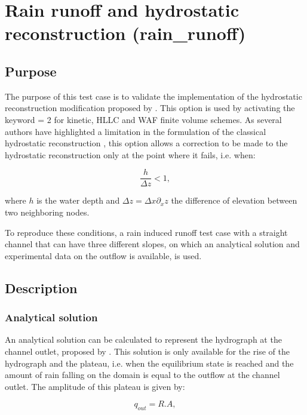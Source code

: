 \chapter{Rain runoff and hydrostatic reconstruction (rain\_runoff)}
\label{chapter:rain_runoff}

\section{Purpose}

The purpose of this test case is to validate the implementation of the
hydrostatic reconstruction modification proposed by \cite{Chen2017}.
This option is used by activating the keyword
 = 2 for kinetic, HLLC and WAF
finite volume schemes.
As several authors have highlighted a limitation in the formulation of the
classical hydrostatic reconstruction \cite{Delestre2012},
this option allows a correction to be made to the hydrostatic reconstruction
only at the point where it fails, i.e. when:

\begin{equation}
 \frac{h}{\Delta z}<1,
\end{equation}

where $h$ is the water depth and $\Delta z=\Delta x\partial_xz$ the difference
of elevation between two neighboring nodes.

To reproduce these conditions, a rain induced runoff test case with a straight
channel that can have three different slopes, on which an analytical solution
and experimental data on the outflow is available, is used.

\section{Description}

\subsection{Analytical solution}

An analytical solution can be calculated to represent the hydrograph at the
channel outlet, proposed by \cite{Delestre2010}.
This solution is only available for the rise of the hydrograph and the plateau,
i.e. when the equilibrium state is reached and the amount of rain falling on the
domain is equal to the outflow at the channel outlet.
The amplitude of this plateau is given by:

\begin{equation}
 q_{out}=R.A,
\end{equation}

